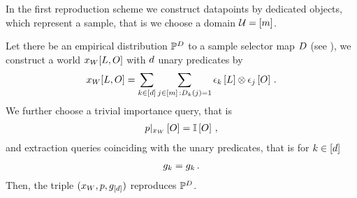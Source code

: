 %





In the first reproduction scheme we construct datapoints by dedicated objects, which represent a sample, that is we choose a domain $\mathcal{U}=[m]$.

\begin{theorem}
    \label{the:reproducingSingleObjects}
    Let there be an empirical distribution $\mathbb{P}^{D}$ to a sample selector map $D$ (see ), we construct a world $x_{W}[L,O]$ with $d$ unary predicates by
    \begin{align*}
        x_{W}[L,O]
        = \sum_{k\in[d]} \sum_{j\in[m] \, : D_{k}(j)=1} \epsilon_{k}\left[L\right] \otimes \epsilon_{j}\left[O\right] \, .
    \end{align*}
    We further choose a trivial importance query, that is
    \begin{align*}
        {p}|_{x_{W}} \left[O\right] = \mathbb{I}\left[O\right] \, ,
    \end{align*}
    and extraction queries coinciding with the unary predicates, that is for $k\in[d]$
    \begin{align*}
        g_{k} = g_{k} \, .
    \end{align*}
    Then, the triple $(x_{W},p,g_{[d]})$ reproduces $\mathbb{P}^{D}$.
\end{theorem}
